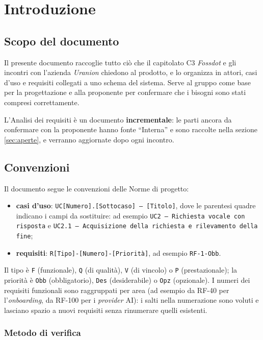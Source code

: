\documentclass[12pt,a4paper]{article}
\newcommand{\tightlist}{\setlength{\itemsep}{1pt}\setlength{\parskip}{0pt}}
\begin{document}
\section{Introduzione}

\subsection{Scopo del documento}

Il presente documento raccoglie tutto ciò che il capitolato C3 \emph{Fossdot} e gli incontri con l'azienda \emph{Uranion} chiedono al prodotto, e lo organizza in attori, casi d'uso e requisiti collegati a uno schema del sistema. Serve al gruppo come base per la progettazione e alla proponente per confermare che i bisogni sono stati compresi correttamente.

L'Analisi dei requisiti è un documento \textbf{incrementale}: le parti ancora da confermare con la proponente hanno fonte ``Interna'' e sono raccolte nella sezione \ref{sec:aperte}, e verranno aggiornate dopo ogni incontro.

\subsection{Convenzioni}

Il documento segue le convenzioni delle Norme di progetto:
\begin{itemize}
\tightlist
\item \textbf{casi d'uso}: \texttt{UC[Numero].[Sottocaso] -- [Titolo]}, dove le parentesi quadre indicano i campi da sostituire: ad esempio \texttt{UC2 -- Richiesta vocale con risposta} e \texttt{UC2.1 -- Acquisizione della richiesta e rilevamento della fine};
\item \textbf{requisiti}: \texttt{R[Tipo]-[Numero]-[Priorità]}, ad esempio \texttt{RF-1-Obb}.
\end{itemize}
Il tipo è \texttt{F} (funzionale), \texttt{Q} (di qualità), \texttt{V} (di vincolo) o \texttt{P} (prestazionale); la priorità è \texttt{Obb} (obbligatorio), \texttt{Des} (desiderabile) o \texttt{Opz} (opzionale). I numeri dei requisiti funzionali sono raggruppati per area (ad esempio da RF-40 per l'\emph{onboarding}, da RF-100 per i \emph{provider} AI): i salti nella numerazione sono voluti e lasciano spazio a nuovi requisiti senza rinumerare quelli esistenti.

\subsubsection{Metodo di verifica}
\end{document}
